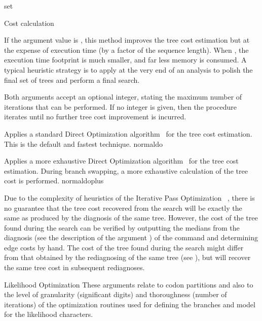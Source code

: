 \begin{command}{set}{}
\begin{arguments}
\begin{argumentgroup}{Cost calculation}
{\setlength{\parindent}{0.5cm}                
\indent
If the argument value is , this method improves the tree
cost estimation but at the expense of execution time (by a factor of the sequence length).
When , the execution time footprint is much
smaller, and far less memory is consumed.
A typical heuristic strategy is to apply  at the 
very end of an analysis to polish the final set of trees and perform a final search. 

\setlength{\parindent}{0.5cm}                
\indent
Both arguments accept an optional integer, stating the maximum
number of iterations that can be performed. If no integer is
given, then the procedure iterates until no further tree cost
improvement is incurred.}
{}

{Applies a standard Direct Optimization algorithm~\cite{Varon2013} for the tree
cost estimation. This is the default and fastest technique.}
{normaldo}

{Applies a more exhaustive Direct Optimization algorithm~\cite{Varon2013} 
for the tree cost estimation. During branch swapping, a more exhaustive 
calculation of the tree cost is performed.}
{normaldoplus}


\begin{statement}
Due to the complexity of heuristics of the Iterative Pass
Optimization ~\cite{wheeler2003a}, there is no guarantee that the 
tree cost recovered from the search will be exactly the same as produced by the
diagnosis of the same tree. However, the cost of the tree found
during the search can be verified by outputting the medians from
the diagnosis (see the description of the argument
) of the command
 and determining edge costs by hand. The cost
of the tree found during the search might differ from that
obtained by the rediagnosing of the same tree (see
), but will recover the same
tree cost in subsequent rediagnoses. 
\end{statement}

\end{argumentgroup}

\begin{argumentgroup}{Likelihood Optimization}
{These arguments relate to codon partitions and also to 
the level of granularity (significant digits) and thoroughness 
(number of iterations) of the optimization routines used 
for defining the branches and model for the likelihood 
characters.}


\end{argumentgroup}
\end{arguments}
\end{command}
